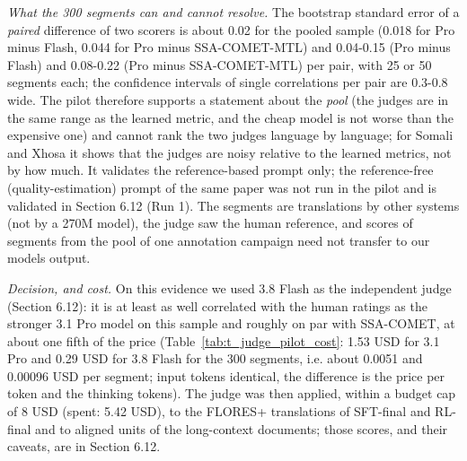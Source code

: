 \emph{What the 300 segments can and cannot resolve.} The bootstrap standard error of a \emph{paired} difference of two scorers is about 0.02 for the pooled sample (0.018 for Pro minus Flash, 0.044 for Pro minus SSA-COMET-MTL) and 0.04-0.15 (Pro minus Flash) and 0.08-0.22 (Pro minus SSA-COMET-MTL) per pair, with 25 or 50 segments each; the confidence intervals of single correlations per pair are 0.3-0.8 wide. The pilot therefore supports a statement about the \emph{pool} (the judges are in the same range as the learned metric, and the cheap model is not worse than the expensive one) and cannot rank the two judges language by language; for Somali and Xhosa it shows that the judges are noisy relative to the learned metrics, not by how much. It validates the reference-based prompt only; the reference-free (quality-estimation) prompt of the same paper was not run in the pilot and is validated in Section 6.12 (Run 1). The segments are translations by other systems (not by a 270M model), the judge saw the human reference, and scores of segments from the pool of one annotation campaign need not transfer to our model\textquotesingle s output.

\emph{Decision, and cost.} On this evidence we used 3.8 Flash as the independent judge (Section 6.12): it is at least as well correlated with the human ratings as the stronger 3.1 Pro model on this sample and roughly on par with SSA-COMET, at about one fifth of the price (Table~\ref{tab:t_judge_pilot_cost}: 1.53 USD for 3.1 Pro and 0.29 USD for 3.8 Flash for the 300 segments, i.e. about 0.0051 and 0.00096 USD per segment; input tokens identical, the difference is the price per token and the thinking tokens). The judge was then applied, within a budget cap of 8 USD (spent: 5.42 USD), to the FLORES+ translations of SFT-final and RL-final and to aligned units of the long-context documents; those scores, and their caveats, are in Section 6.12.

